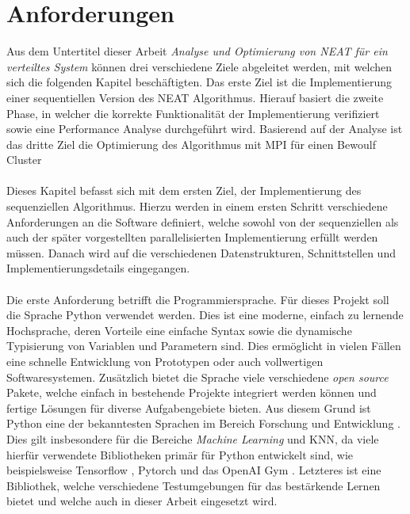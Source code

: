 \section{Anforderungen}
\label{sec:requirements}
Aus dem Untertitel dieser Arbeit \emph{Analyse und Optimierung von \ac{NEAT} für ein verteiltes System} können drei verschiedene Ziele abgeleitet werden, mit welchen sich die folgenden Kapitel beschäftigten. Das erste Ziel ist die Implementierung einer sequentiellen Version des \ac{NEAT} Algorithmus. Hierauf basiert die zweite Phase, in welcher die korrekte Funktionalität der Implementierung verifiziert sowie eine Performance Analyse durchgeführt wird. 
Basierend auf der Analyse ist das dritte Ziel die Optimierung des Algorithmus mit \ac{MPI} für einen Bewoulf Cluster
\\\\
Dieses Kapitel befasst sich mit dem ersten Ziel, der Implementierung des sequenziellen Algorithmus. Hierzu werden in einem ersten Schritt verschiedene Anforderungen an die Software definiert, welche sowohl von der sequenziellen als auch der später vorgestellten parallelisierten Implementierung erfüllt werden müssen. Danach wird auf die verschiedenen Datenstrukturen, Schnittstellen und Implementierungsdetails eingegangen.
\\\\
Die erste Anforderung betrifft die Programmiersprache. Für dieses Projekt soll die Sprache Python verwendet werden. Dies ist eine moderne, einfach zu lernende Hochsprache, deren Vorteile eine einfache Syntax sowie die dynamische Typisierung von Variablen und Parametern sind. Dies ermöglicht in vielen Fällen eine schnelle Entwicklung von Prototypen oder auch vollwertigen Softwaresystemen. Zusätzlich bietet die Sprache viele verschiedene \emph{open source} Pakete, welche einfach in bestehende Projekte integriert werden können und fertige Lösungen für diverse Aufgabengebiete bieten. Aus diesem Grund ist Python eine der bekanntesten Sprachen im Bereich Forschung und Entwicklung \cite{dalcin2011parallel}. Dies gilt insbesondere für die Bereiche \emph{Machine Learning} und \ac{KNN}, da viele hierfür verwendete Bibliotheken primär für Python entwickelt sind, wie beispielsweise Tensorflow \cite{tensorflow2015}, Pytorch \cite{pytorch2019} und das OpenAI Gym \cite{OpenAiGym2016}. Letzteres ist eine Bibliothek, welche verschiedene Testumgebungen für das bestärkende Lernen bietet und welche auch in dieser Arbeit eingesetzt wird.  
\\\\
